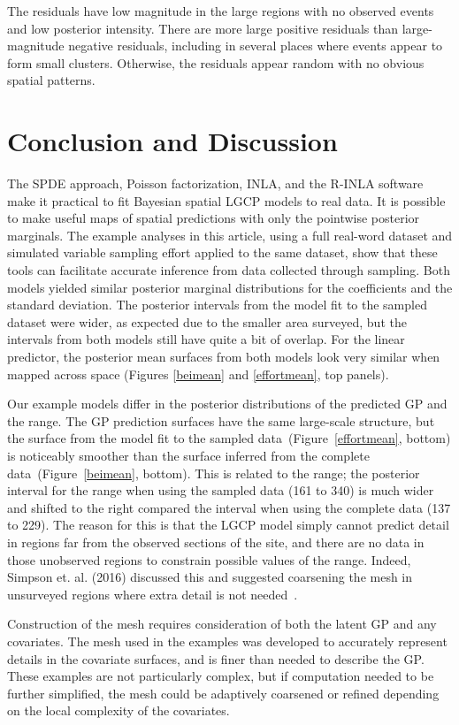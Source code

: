 \documentclass[]{interact}
\begin{document}
The residuals have low magnitude in the large regions with no observed events
and low posterior intensity. There are more large positive residuals than
large-magnitude negative residuals, including in several places where events
appear to form small clusters. Otherwise, the residuals appear random with no
obvious spatial patterns.


\section{Conclusion and Discussion}
\label{conclusion}

The SPDE approach, Poisson factorization, INLA, and the R-INLA software make
it practical to fit Bayesian spatial LGCP models to real data. It is possible
to make useful maps of spatial predictions with only the pointwise posterior
marginals. The example analyses in this article, using a full real-word dataset and
simulated variable sampling effort applied to the same dataset, show that these
tools can facilitate accurate inference from data collected through sampling.
Both models yielded similar posterior marginal distributions for the
coefficients and the standard deviation. The posterior intervals from the
model fit to the sampled dataset were wider, as expected due to the smaller
area surveyed, but the intervals from both models still have quite a bit of
overlap. For the linear predictor, the posterior mean surfaces from both models
look very similar when mapped across space (Figures \ref{beimean} and
\ref{effortmean}, top panels).

Our example models differ in the posterior distributions of the predicted GP
and the range. The GP prediction surfaces have the same large-scale structure,
but the surface from the model fit to the sampled
data~(Figure~\ref{effortmean}, bottom) is noticeably smoother than the surface
inferred from the complete data~(Figure~\ref{beimean}, bottom).
This is related to the range; the posterior interval for the range when using
the sampled data (161 to 340) is much wider and shifted to the right compared
the interval when using the complete data (137 to 229). The reason for this is
that the LGCP model simply cannot predict detail in regions far from the
observed sections of the site, and there are no data in those unobserved
regions to constrain possible values of the range. Indeed, Simpson et. al.
(2016) discussed this and suggested coarsening the mesh in unsurveyed regions
where extra detail is not needed~\cite{simpsonetal}.

Construction of the mesh requires consideration of both the latent GP and any
covariates. The mesh used in the examples was developed to accurately represent
details in the covariate surfaces, and is finer than needed to describe the
GP. These examples are not particularly complex, but if computation needed
to be further simplified, the mesh could be adaptively coarsened or refined
depending on the local complexity of the covariates.
\end{document}
